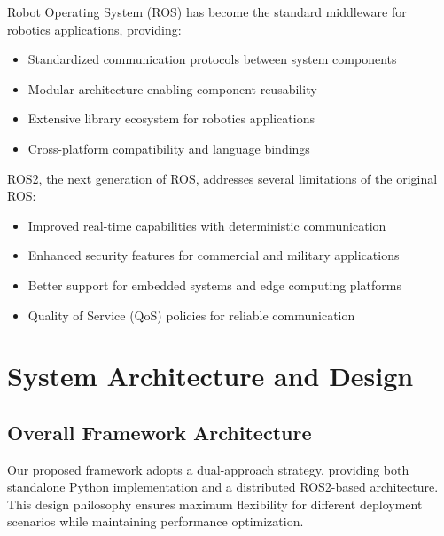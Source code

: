 \documentclass[11pt,a4paper]{article}
\begin{document}
Robot Operating System (ROS) has become the standard middleware for robotics applications, providing:

\begin{itemize}
    \item Standardized communication protocols between system components
    \item Modular architecture enabling component reusability
    \item Extensive library ecosystem for robotics applications
    \item Cross-platform compatibility and language bindings
\end{itemize}

ROS2, the next generation of ROS, addresses several limitations of the original ROS:

\begin{itemize}
    \item Improved real-time capabilities with deterministic communication
    \item Enhanced security features for commercial and military applications
    \item Better support for embedded systems and edge computing platforms
    \item Quality of Service (QoS) policies for reliable communication
\end{itemize}

\section{System Architecture and Design}

\subsection{Overall Framework Architecture}

Our proposed framework adopts a dual-approach strategy, providing both standalone Python implementation and a distributed ROS2-based architecture. This design philosophy ensures maximum flexibility for different deployment scenarios while maintaining performance optimization.
\end{document}

